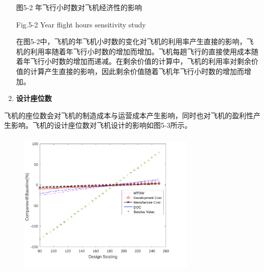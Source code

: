 \documentclass[12pt]{article}
\begin{document}
\begin{CJK*}{UTF8}{gbsn}
\begin{enumerate}

\par

\begin{Center}
图5-2 年飞行小时数对飞机经济性的影响
\end{Center}\par

\begin{Center}
Fig.5-2 Year flight hours sensitivity study 
\end{Center}\par


\vspace{\baselineskip}
在图5-2中，飞机的年飞机小时数的变化对飞机的利用率产生直接的影响，飞机的利用率随着年飞行小时数的增加而增加。飞机每趟飞行的直接使用成本随着年飞行小时数的增加而递减。在剩余价值的计算中，飞机的利用率对剩余价值的计算产生直接的影响，因此剩余价值随着飞机年飞行小时数的增加而增加。\par

	\item \textbf{设计座位数}
\end{enumerate}\par

飞机的座位数会对飞机的制造成本与运营成本产生影响，同时也对飞机的盈利性产生影响。飞机的设计座位数对飞机设计的影响如图5-3所示。\par




\begin{figure}[H]
	\begin{Center}
		\includegraphics[width=3.33in,height=2.77in]{./media511/image3.pdf}
	\end{Center}
\end{figure}



\end{CJK*}
\end{document}
